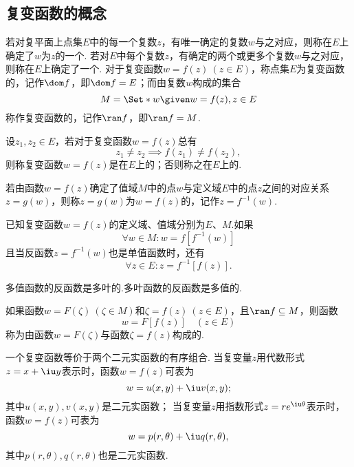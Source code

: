 \subsection{复变函数的概念}
\begin{definition}
若对复平面上点集\(E\)中的每一个复数\(z\)，有唯一确定的复数\(w\)与之对应，则称在\(E\)上确定了\(w\)为\(z\)的一个.
若对\(E\)中每个复数\(z\)，有确定的两个或更多个复数\(w\)与之对应，则称在\(E\)上确定了一个.
对于复变函数\(w = f(z)\ (z \in E)\)，称点集\(E\)为复变函数的，记作\(\dom f\)，即\(\dom f = E\)；而由复数\(w\)构成的集合\[
M = \Set*{ w \given w = f(z), z \in E }
\]称作复变函数的，记作\(\ran f\)，即\(\ran f = M\).

设\(z_1,z_2 \in E\)，若对于复变函数\(w=f(z)\)总有\[
z_1 \neq z_2 \implies f(z_1) \neq f(z_2),
\]则称复变函数\(w=f(z)\)是在\(E\)上的；否则称之在\(E\)上的.
\end{definition}

\begin{definition}
若由函数\(w=f(z)\)确定了值域\(M\)中的点\(w\)与定义域\(E\)中的点\(z\)之间的对应关系\(z=g(w)\)，则称\(z=g(w)\)为\(w=f(z)\)的，记作\(z=f^{-1}(w)\).
\end{definition}

\begin{property}
已知复变函数\(w=f(z)\)的定义域、值域分别为\(E\)、\(M\).如果\[
\forall w \in M: w=f[f^{-1}(w)]
\]且当反函数\(z=f^{-1}(w)\)也是单值函数时，还有\[
\forall z \in E : z=f^{-1}[f(z)].
\]
\end{property}

\begin{property}
多值函数的反函数是多叶的.多叶函数的反函数是多值的.
\end{property}

\begin{definition}
如果函数\(w = F(\zeta)\ (\zeta \in M)\)和\(\zeta = f(z)\ (z \in E)\)，且\(\ran f \subseteq M\)，则函数\[
w = F[f(z)] \quad (z \in E)
\]称为由函数\(w = F(\zeta)\)与函数\(\zeta = f(z)\)构成的.
\end{definition}

一个复变函数等价于两个二元实函数的有序组合.
当复变量\(z\)用代数形式\(z = x + \iu y\)表示时，函数\(w = f(z)\)可表为\[
w = u(x,y) + \iu v(x,y);
\]其中\(u(x,y), v(x,y)\)是二元实函数；
当复变量\(z\)用指数形式\(z = r e^{\iu \theta}\)表示时，函数\(w = f(z)\)可表为\[
w = p(r,\theta) + \iu q(r,\theta),
\]其中\(p(r,\theta), q(r,\theta)\)也是二元实函数.

